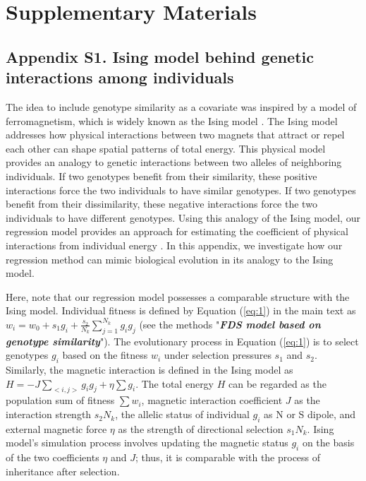 \documentclass[12pt,]{article}
\newcommand{\beginsupplement}{%
        \setcounter{table}{0}
        \renewcommand{\thetable}{S\arabic{table}}%
        \setcounter{figure}{0}
        \renewcommand{\thefigure}{S\arabic{figure}}%
        \setcounter{equation}{0}
        \renewcommand{\theequation}{S\arabic{equation}}
     }
\begin{document}
\newpage
\clearpage

\section*{Supplementary Materials}
\beginsupplement

\medskip

\subsection*{Appendix S1. Ising model behind genetic interactions among individuals}

The idea to include genotype similarity as a covariate was inspired by a model of ferromagnetism, which is widely known as the Ising model \citep{cipra1987introduction}. The Ising model addresses how physical interactions between two magnets that attract or repel each other can shape spatial patterns of total energy. This physical model provides an analogy to genetic interactions between two alleles of neighboring individuals. If two genotypes benefit from their similarity, these positive interactions force the two individuals to have similar genotypes. If two genotypes benefit from their dissimilarity, these negative interactions force the two individuals to have different genotypes. Using this analogy of the Ising model, our regression model provides an approach for estimating the coefficient of physical interactions from individual energy \citep{sato2019neighbor, sato2020neighbor}. In this appendix, we investigate how our regression method can mimic biological evolution in its analogy to the Ising model.

Here, note that our regression model possesses a comparable structure with the Ising model. Individual fitness is defined by Equation (\ref{eq:1}) in the main text as $w_i = w_0 + s_1 g_i + \frac{s_2}{N_k}\sum^{N_{k}}_{j=1}{g_ig_j}$ (see the methods "\textit{\textbf{FDS model based on genotype similarity}}"). The evolutionary process in Equation (\ref{eq:1}) is to select genotypes $g_i$ based on the fitness $w_i$ under selection pressures $s_1$ and $s_2$. Similarly, the magnetic interaction is defined in the Ising model as $H = -J\sum_{<i,j>}{g_ig_j} + \eta\sum{g_i}$. The total energy $H$ can be regarded as the population sum of fitness $\sum{w_i}$, magnetic interaction coefficient $J$ as the interaction strength $s_2N_k$, the allelic status of individual $g_i$ as N or S dipole, and external magnetic force $\eta$ as the strength of directional selection $s_1N_k$. Ising model's simulation process involves updating the magnetic status $g_i$ on the basis of the two coefficients $\eta$ and $J$; thus, it is comparable with the process of inheritance after selection.
\end{document}
